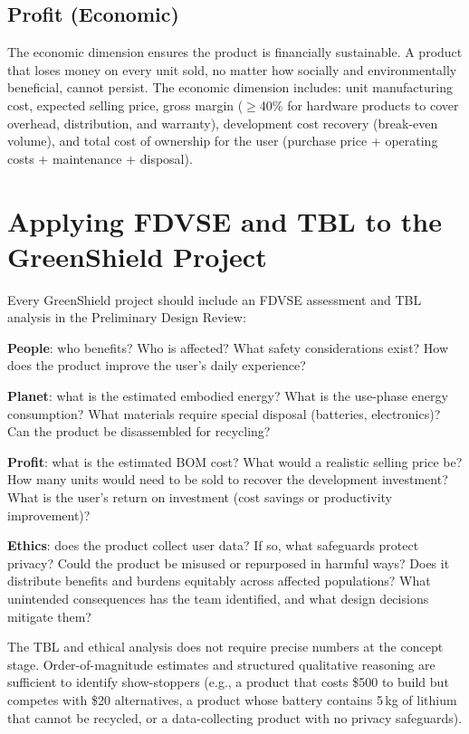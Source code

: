 \subsection{Profit (Economic)}
The economic dimension ensures the product is financially sustainable. A product that loses money on every unit sold, no matter how socially and environmentally beneficial, cannot persist. The economic dimension includes: unit manufacturing cost, expected selling price, gross margin ($\geq$40\% for hardware products to cover overhead, distribution, and warranty), development cost recovery (break-even volume), and total cost of ownership for the user (purchase price + operating costs + maintenance + disposal).

\section{Applying FDVSE and TBL to the GreenShield Project}
Every GreenShield project should include an FDVSE assessment and TBL analysis in the Preliminary Design Review:

\textbf{People}: who benefits? Who is affected? What safety considerations exist? How does the product improve the user's daily experience?

\textbf{Planet}: what is the estimated embodied energy? What is the use-phase energy consumption? What materials require special disposal (batteries, electronics)? Can the product be disassembled for recycling?

\textbf{Profit}: what is the estimated BOM cost? What would a realistic selling price be? How many units would need to be sold to recover the development investment? What is the user's return on investment (cost savings or productivity improvement)?

\textbf{Ethics}: does the product collect user data? If so, what safeguards protect privacy? Could the product be misused or repurposed in harmful ways? Does it distribute benefits and burdens equitably across affected populations? What unintended consequences has the team identified, and what design decisions mitigate them?

The TBL and ethical analysis does not require precise numbers at the concept stage. Order-of-magnitude estimates and structured qualitative reasoning are sufficient to identify show-stoppers (e.g., a product that costs \$500 to build but competes with \$20 alternatives, a product whose battery contains 5\,kg of lithium that cannot be recycled, or a data-collecting product with no privacy safeguards).

